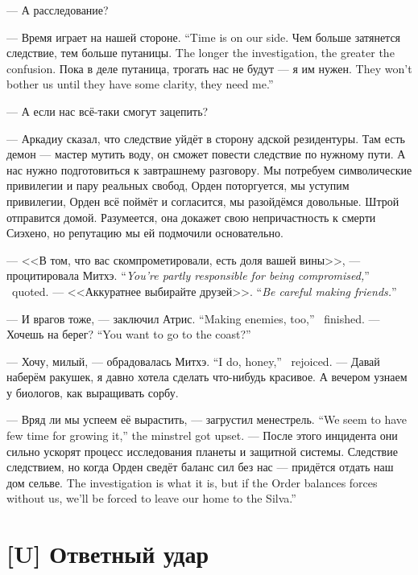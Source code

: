 --- А расследование?

{--- Время играет на нашей стороне.}
{``Time is on our side.}
{Чем больше затянется следствие, тем больше путаницы.}
{The longer the investigation, the greater the confusion.}
{Пока в деле путаница, трогать нас не будут --- я им нужен.}
{They won't bother us until they have some clarity, they need me.''}

--- А если нас всё-таки смогут зацепить?

--- Аркадиу сказал, что следствие уйдёт в сторону адской резидентуры.
Там есть демон --- мастер мутить воду, он сможет повести следствие по нужному пути.
А нас нужно подготовиться к завтрашнему разговору.
Мы потребуем символические привилегии и пару реальных свобод, Орден поторгуется, мы уступим привилегии, Орден всё поймёт и согласится, мы разойдёмся довольные.
Штрой отправится домой.
Разумеется, она докажет свою непричастность к смерти Сиэхено, но репутацию мы ей подмочили основательно.

{--- <<В том, что вас скомпрометировали, есть доля вашей вины>>, --- процитировала Митхэ.}
{``\emph{You're partly responsible for being compromised,}'' \Mitchoe\ quoted.}
{--- <<Аккуратнее выбирайте друзей>>.}
{``\emph{Be careful making friends.}''}

{--- И врагов тоже, --- заключил Атрис.}
{``Making enemies, too,'' \Aatris\ finished.}
{--- Хочешь на берег?}
{``You want to go to the coast?''}

{--- Хочу, милый, --- обрадовалась Митхэ.}
{``I do, honey,'' \Mitchoe\ rejoiced.}
--- Давай наберём ракушек, я давно хотела сделать что-нибудь красивое.
А вечером узнаем у биологов, как выращивать сорбу.

{--- Вряд ли мы успеем её вырастить, --- загрустил менестрель.}
{``We seem to have few time for growing it,'' the minstrel got upset.}
--- После этого инцидента они сильно ускорят процесс исследования планеты и защитной системы.
{Следствие следствием, но когда Орден сведёт баланс сил без нас --- придётся отдать наш дом сельве\FM.}
{The investigation is what it is, but if the Order balances forces without us, we'll be forced to leave our home to the Silva\FM.''}

\chapter{[U] Ответный удар}

